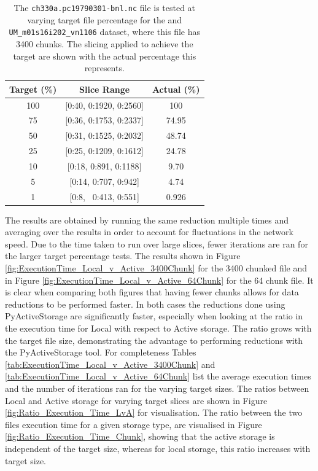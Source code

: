 \documentclass{article}
\begin{document}
\begin{table}[h!]
    \centering
    \renewcommand{\arraystretch}{1.1}
    \begin{tabular}{ccc}
        \hline
        Target (\%) & Slice Range              & Actual (\%) \\ \hline 
         100        & [0:40, 0:1920, 0:2560]   & 100         \\
         75         & [0:36, 0:1753, 0:2337]   & 74.95       \\
         50         & [0:31, 0:1525, 0:2032]   & 48.74       \\
         25         & [0:25, 0:1209, 0:1612]   & 24.78       \\        
         10         & [0:18, 0:891, 0:1188]    & 9.70        \\
         5          & [0:14, 0:707, 0:942]     & 4.74        \\
         1          & [0:8, ~0:413, 0:551]     & 0.926       \\ \hline
    \end{tabular}
    \caption{The \texttt{ch330a.pc19790301-bnl.nc} file is tested at varying target file percentage for the and \texttt{UM\_m01s16i202\_vn1106} dataset, where this file has 3400 chunks. The slicing applied to achieve the target are shown with the actual percentage this represents.}
    \label{tab:Local_v_Active_FileSlicing}
\end{table}


The results are obtained by running the same reduction multiple times and averaging over the results in order to account for fluctuations in the network speed. Due to the time taken to run over large slices, fewer iterations are ran for the larger target percentage tests. The results shown in Figure \ref{fig:ExecutionTime_Local_v_Active_3400Chunk} for the 3400 chunked file and in Figure \ref{fig:ExecutionTime_Local_v_Active_64Chunk} for the 64 chunk file. It is clear when comparing both figures that having fewer chunks allows for data reductions to be performed faster. In both cases the reductions done using PyActiveStorage are significantly faster, especially when looking at the ratio in the execution time for Local with respect to Active storage. The ratio grows with the target file size, demonstrating the advantage to performing reductions with the PyActiveStorage tool. For completeness Tables \ref{tab:ExecutionTime_Local_v_Active_3400Chunk} and \ref{tab:ExecutionTime_Local_v_Active_64Chunk} list the average execution times and the number of iterations ran for the varying target sizes.  
The ratios between Local and Active storage for varying target slices are shown in Figure \ref{fig:Ratio_Execution_Time_LvA} for visualisation. The ratio between the two files execution time for a given storage type, are visualised in Figure \ref{fig:Ratio_Execution_Time_Chunk}, showing that the active storage is independent of the target size, whereas for local storage, this ratio increases with target size. 
\end{document}
